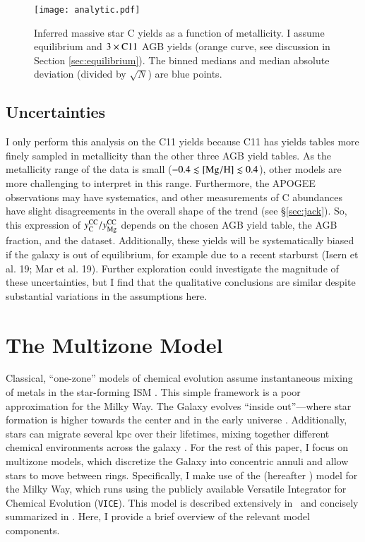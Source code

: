 \documentclass[12pt,oneside]{report}
\newcommand{\JJ}{\citetalias{james+21}}
\newcommand{\VICE}{\texttt{VICE}}
\newcommand{\Ycc}{\ensuremath{y_{\rm C}^{\rm CC}}}
\newcommand{\Yoc}{\ensuremath{y_{\rm Mg}^{\rm CC}}}
\begin{document}
\begin{figure}
    \centering
    \texttt{[image: analytic.pdf]}
    \caption[Reverse fit yields]{Inferred massive star C yields as a function of metallicity. I assume equilibrium and $3\times {\rm C11}$ AGB yields (orange curve, see discussion in Section \ref{sec:equilibrium}). The binned medians and median absolute deviation (divided by $\sqrt{N}$) are blue points.
    }
    \label{fig:analytic}
\end{figure}





\section{Uncertainties}

I only perform this analysis on the C11 yields because C11 has yields tables more finely sampled in metallicity than the other three AGB yield tables. As the metallicity range of the data is small ($-0.4\lesssim {\rm [Mg/H]} \lesssim 0.4$), other models are more challenging to interpret in this range. Furthermore, the APOGEE observations may have systematics, and other measurements of C abundances \citep[e.g.][]{vincenzo+21} have slight disagreements in the overall shape of the trend (see \S\ref{sec:jack}).
So, this expression of $\Ycc/\Yoc$ depends on the chosen AGB yield table, the AGB fraction, and the dataset. 
Additionally, these yields will be systematically biased if the galaxy is out of equilibrium, for example due to a recent starburst (Isern et al. 19; Mar et al. 19). Further exploration could investigate the magnitude of these uncertainties, but I find that the qualitative conclusions are similar despite substantial variations in the assumptions here.



\chapter{The Multizone Model}\label{sec:vice}

Classical, ``one-zone'' models of chemical evolution assume instantaneous mixing of metals in the star-forming ISM \citep[e.g.][]{matteucci21}. This simple framework is a poor approximation for the Milky Way.  The Galaxy evolves ``inside out''---where star formation is higher towards the center and in the early universe \citep{bird+13}. Additionally, stars can migrate several kpc over their lifetimes, mixing together different chemical environments across the galaxy \citep{bird+12,sellwood+binney02}. For the rest of this paper, I focus on multizone models, which discretize the Galaxy into concentric annuli and allow stars to move between rings.  Specifically, I make use of the \citet{james+21} (hereafter \JJ) model for the Milky Way, which runs using the publicly available Versatile Integrator for Chemical Evolution (\VICE). This model is described extensively in \JJ~and concisely summarized  in \citet{james+23}. Here, I provide a brief overview of the relevant model components.
\end{document}

